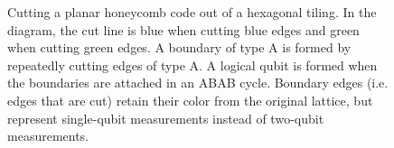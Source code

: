 \documentclass[onecolumn,unpublished,a4paper]{quantumarticle}
\theoremstyle{definition}
\theoremstyle{definition}
\theoremstyle{definition}
\begin{document}
\begin{figure}[ht!]
    \centering
    \caption{
    Cutting a planar honeycomb code out of a hexagonal tiling.
    In the diagram, the cut line is blue when cutting blue edges and green when cutting green edges.
    A boundary of type A is formed by repeatedly cutting edges of type A.
    A logical qubit is formed when the boundaries are attached in an ABAB cycle.
    Boundary edges (i.e. edges that are cut) retain their color from the original lattice, but represent single-qubit measurements instead of two-qubit measurements.
    }
    \label{fig:cut_out_patch}
\end{figure}
\end{document}
